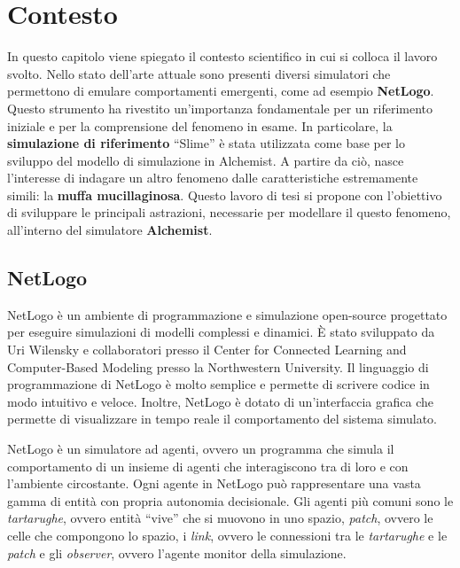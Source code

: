\chapter{Contesto}
In questo capitolo viene spiegato il contesto scientifico in cui si colloca il lavoro svolto.
Nello stato dell'arte attuale sono presenti diversi simulatori che permettono di emulare comportamenti emergenti, come ad esempio \textbf{NetLogo}.
Questo strumento ha rivestito un'importanza fondamentale per un riferimento iniziale e per la comprensione del fenomeno in esame.
In particolare, la \textbf{simulazione di riferimento} ``Slime'' è stata utilizzata come base per lo sviluppo del modello di simulazione in Alchemist.
A partire da ciò, nasce l'interesse di indagare un altro fenomeno dalle caratteristiche estremamente simili: la \textbf{muffa mucillaginosa}.
Questo lavoro di tesi si propone con l'obiettivo di sviluppare le principali astrazioni, necessarie per modellare il questo fenomeno,
all'interno del simulatore \textbf{Alchemist}.

\section{NetLogo}
NetLogo\space\cite{wilensky1997netlogo} è un ambiente di programmazione e simulazione open-source
progettato per eseguire simulazioni di modelli complessi e dinamici. È stato sviluppato da Uri Wilensky
e collaboratori presso il Center for Connected Learning and Computer-Based Modeling presso la Northwestern University.
Il linguaggio di programmazione di NetLogo è molto semplice e permette di scrivere codice in modo
intuitivo e veloce. Inoltre, NetLogo è dotato di un'interfaccia grafica che permette di visualizzare
in tempo reale il comportamento del sistema simulato. 

NetLogo è un simulatore ad agenti, ovvero un
programma che simula il comportamento di un insieme di agenti che interagiscono tra di loro e con
l'ambiente circostante. Ogni agente in NetLogo può rappresentare una vasta gamma di entità con propria autonomia
decisionale. Gli agenti più comuni sono le \textit{tartarughe}, ovvero entità ``vive'' che si muovono in uno spazio,
\textit{patch}, ovvero le celle che compongono lo spazio, i \textit{link}, ovvero le connessioni tra le \textit{tartarughe} e 
le \textit{patch} e gli \textit{observer}, ovvero l'agente monitor della simulazione.

